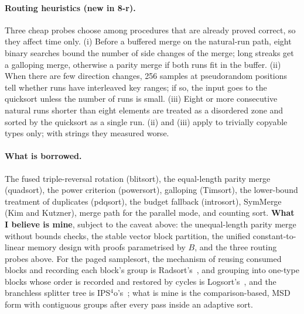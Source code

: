 \documentclass[10pt,a4paper]{article}
\begin{document}
\paragraph{Routing heuristics (new in 8-r).} Three cheap probes choose among procedures
that are already proved correct, so they affect time only. (i) Before a buffered merge
on the natural-run path, eight binary searches bound the number of side changes of the
merge; long streaks get a galloping merge, otherwise a parity merge if both runs fit in
the buffer. (ii) When there are few direction changes, 256 samples at pseudorandom
positions tell whether runs have interleaved key ranges; if so, the input goes to the
quicksort unless the number of runs is small. (iii) Eight or more consecutive natural
runs shorter than eight elements are treated as a disordered zone and sorted by the
quicksort as a single run. (ii) and (iii) apply to trivially copyable types only; with
strings they measured worse.

\paragraph{What is borrowed.} The fused triple-reversal rotation (blitsort), the equal-length
parity merge (quadsort), the power criterion (powersort), galloping (Timsort), the lower-bound
treatment of duplicates (pdqsort), the budget fallback (introsort), SymMerge (Kim and Kutzner),
merge path for the parallel mode, and counting sort. \textbf{What I believe is mine}, subject to
the caveat above: the unequal-length parity merge without bounds checks, the stable vector block
partition, the unified constant-to-linear memory design with proofs parametrised by $B$, and the
three routing probes above. For the paged samplesort, the mechanism of reusing consumed blocks
and recording each block's group is Radsort's~\cite{radsort}, and grouping into one-type blocks
whose order is recorded and restored by cycles is Logsort's~\cite{logsort}, and the branchless
splitter tree is IPS$^4$o's~\cite{ips4o}; what is mine is the
comparison-based, MSD form with contiguous groups after every pass inside an adaptive sort.
\end{document}
